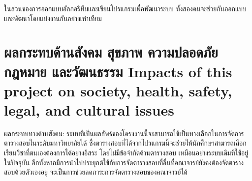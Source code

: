ในส่วนของการออกแบบอัลกอริทึมและเขียนโปรแกรมเพื่อพัฒนาระบบ ทั้งสองคนจะช่วยกันออกแบบและพัฒนาโดยแบ่งงานกันอย่างเท่าเทียม

\section{\ifcpe%
ผลกระทบด้านสังคม สุขภาพ ความปลอดภัย กฎหมาย และวัฒนธรรม
\else%
Impacts of this project on society, health, safety, legal, and cultural issues
\fi}

ผลกระทบทางด้านสังคม: ระบบที่เป็นผลลัพธ์ของโครงงานนี้จะสามารถใช้เป็นทางเลือกในการจัดการตารางสอบในระดับมหาวิทยาลัยได้
ซึ่งตารางสอบที่ได้จากโปรแกรมนี้จะช่วยให้นักศึกษาสามารถเลือกเรียนวิชาที่ตนเองต้องการได้อย่างอิสระ โดยไม่มีข้อจำกัดด้านตารางสอบ
เหมือนอย่างระบบเดิมที่ใช้อยู่ในปัจจุบัน อีกทั้งหากมีการนำไปประยุกต์ใช้กับการจัดตารางสอบที่อื่นที่คณาจารย์ยังคงต้องจัดตารางสอบด้วยตัวเองอยู่
จะเป็นการช่วยลดภาระการจัดตารางสอบของคณาจารย์ได้